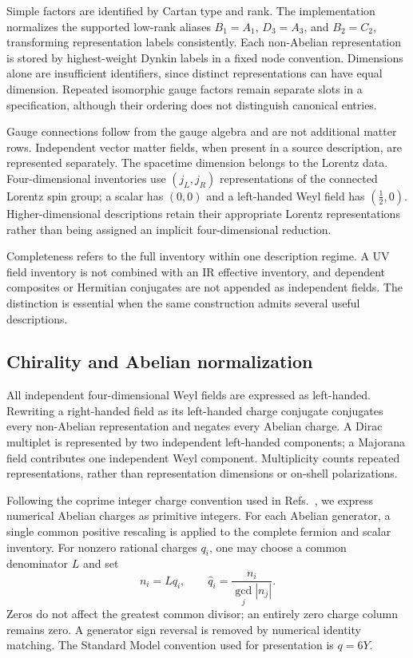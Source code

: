 Simple factors are identified by Cartan type and rank. The implementation normalizes the supported low-rank aliases $B_1=A_1$, $D_3=A_3$, and $B_2=C_2$, transforming representation labels consistently. Each non-Abelian representation is stored by highest-weight Dynkin labels in a fixed node convention. Dimensions alone are insufficient identifiers, since distinct representations can have equal dimension. Repeated isomorphic gauge factors remain separate slots in a specification, although their ordering does not distinguish canonical entries.

Gauge connections follow from the gauge algebra and are not additional matter rows. Independent vector matter fields, when present in a source description, are represented separately. The spacetime dimension belongs to the Lorentz data. Four-dimensional inventories use $(j_L,j_R)$ representations of the connected Lorentz spin group; a scalar has $(0,0)$ and a left-handed Weyl field has $(\tfrac12,0)$. Higher-dimensional descriptions retain their appropriate Lorentz representations rather than being assigned an implicit four-dimensional reduction.

Completeness refers to the full inventory within one description regime. A UV field inventory is not combined with an IR effective inventory, and dependent composites or Hermitian conjugates are not appended as independent fields. The distinction is essential when the same construction admits several useful descriptions.

\subsection{Chirality and Abelian normalization}

All independent four-dimensional Weyl fields are expressed as left-handed. Rewriting a right-handed field as its left-handed charge conjugate conjugates every non-Abelian representation and negates every Abelian charge. A Dirac multiplet is represented by two independent left-handed components; a Majorana field contributes one independent Weyl component. Multiplicity counts repeated representations, rather than representation dimensions or on-shell polarizations.

Following the coprime integer charge convention used in Refs.~\cite{CostaDobrescuFox2019,CostaDobrescuFox2020,Costa2020Um}, we express numerical Abelian charges as primitive integers. For each Abelian generator, a single common positive rescaling is applied to the complete fermion and scalar inventory. For nonzero rational charges $q_i$, one may choose a common denominator $L$ and set
\begin{equation}
n_i=Lq_i,\qquad
\widehat q_i=\frac{n_i}{\gcd_j |n_j|}.
\label{eq:primitive}
\end{equation}
Zeros do not affect the greatest common divisor; an entirely zero charge column remains zero. A generator sign reversal is removed by numerical identity matching. The Standard Model convention used for presentation is $q=6Y$.

